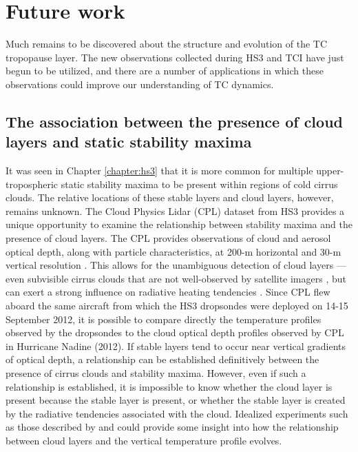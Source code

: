 \section{Future work}

Much remains to be discovered about the structure and evolution of the TC tropopause layer.
The new observations collected during HS3 and TCI have just begun to be utilized, and there are a number of applications in which these observations could improve our understanding of TC dynamics.

\subsection{The association between the presence of cloud layers and static stability maxima}

It was seen in Chapter \ref{chapter:hs3} that it is more common for multiple upper-tropospheric static stability maxima to be present within regions of cold cirrus clouds.
The relative locations of these stable layers and cloud layers, however, remains unknown.
The Cloud Physics Lidar (CPL) dataset from HS3 provides a unique opportunity to examine the relationship between stability maxima and the presence of cloud layers.
The CPL provides observations of cloud and aerosol optical depth, along with particle characteristics, at 200-m horizontal and 30-m vertical resolution \citep{CPL}.
This allows for the unambiguous detection of cloud layers --- even subvisible cirrus clouds that are not well-observed by satellite imagers \citep{Braunetal2016}, but can exert a strong influence on radiative heating tendencies \citep{Durranetal2009}.
Since CPL flew aboard the same aircraft from which the HS3 dropsondes were deployed on 14-15 September 2012, it is possible to compare directly the temperature profiles observed by the dropsondes to the cloud optical depth profiles observed by CPL in Hurricane Nadine (2012).
If stable layers tend to occur near vertical gradients of optical depth, a relationship can be established definitively between the presence of cirrus clouds and stability maxima.
However, even if such a relationship is established, it is impossible to know whether the cloud layer is present because the stable layer is present, or whether the stable layer is created by the radiative tendencies associated with the cloud.
Idealized experiments such as those described by \cite{Durranetal2009} and \cite{Dinhetal2010} could provide some insight into how the relationship between cloud layers and the vertical temperature profile evolves.

